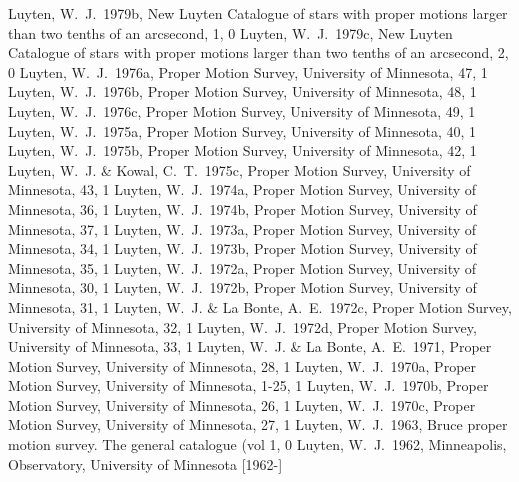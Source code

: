 \documentclass[twocolumn,tighten,twocolappendix]{aastex631}
\begin{document}
\begin{thebibliography}{}
 Luyten, W.~J.\ 1979b, New Luyten Catalogue of stars with proper motions larger than two tenths of an arcsecond, 1, 0
 Luyten, W.~J.\ 1979c, New Luyten Catalogue of stars with proper motions larger than two tenths of an arcsecond, 2, 0
 Luyten, W.~J.\ 1976a, Proper Motion Survey, University of Minnesota, 47, 1
 Luyten, W.~J.\ 1976b, Proper Motion Survey, University of Minnesota, 48, 1
 Luyten, W.~J.\ 1976c, Proper Motion Survey, University of Minnesota, 49, 1
 Luyten, W.~J.\ 1975a, Proper Motion Survey, University of Minnesota, 40, 1
 Luyten, W.~J.\ 1975b, Proper Motion Survey, University of Minnesota, 42, 1
 Luyten, W.~J. \& Kowal, C.~T.\ 1975c, Proper Motion Survey, University of Minnesota, 43, 1
 Luyten, W.~J.\ 1974a, Proper Motion Survey, University of Minnesota, 36, 1
 Luyten, W.~J.\ 1974b, Proper Motion Survey, University of Minnesota, 37, 1
 Luyten, W.~J.\ 1973a, Proper Motion Survey, University of Minnesota, 34, 1
 Luyten, W.~J.\ 1973b, Proper Motion Survey, University of Minnesota, 35, 1
 Luyten, W.~J.\ 1972a, Proper Motion Survey, University of Minnesota, 30, 1
 Luyten, W.~J.\ 1972b, Proper Motion Survey, University of Minnesota, 31, 1
 Luyten, W.~J. \& La Bonte, A.~E.\ 1972c, Proper Motion Survey, University of Minnesota, 32, 1
 Luyten, W.~J.\ 1972d, Proper Motion Survey, University of Minnesota, 33, 1
 Luyten, W.~J. \& La Bonte, A.~E.\ 1971, Proper Motion Survey, University of Minnesota, 28, 1
 Luyten, W.~J.\ 1970a, Proper Motion Survey, University of Minnesota, 1-25, 1
 Luyten, W.~J.\ 1970b, Proper Motion Survey, University of Minnesota, 26, 1
 Luyten, W.~J.\ 1970c, Proper Motion Survey, University of Minnesota, 27, 1
 Luyten, W.~J.\ 1963, Bruce proper motion survey. The general catalogue (vol 1, 0
 Luyten, W.~J.\ 1962, Minneapolis, Observatory, University of Minnesota [1962-]

\end{thebibliography}
\end{document}
